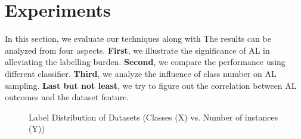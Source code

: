 \section{Experiments}
\label{sec:eval}
In this section, we evaluate our techniques along with
The results can be analyzed from four aspects. \textbf{First},  we illustrate the significance of AL in alleviating the labelling burden. \textbf{Second}, we compare the performance using different classifier. \textbf{Third}, we analyze the influence of class number on AL sampling. \textbf{Last but not least}, we try to figure out the correlation between AL outcomes and the dataset feature.


\begin{figure}[th]
	\centering
	\newline
    \newline
    \newline
	\caption{Label Distribution of Datasets (Classes (X) vs. Number of 
instances (Y)) 
} 
\label{fig:distribution}
\end{figure}
